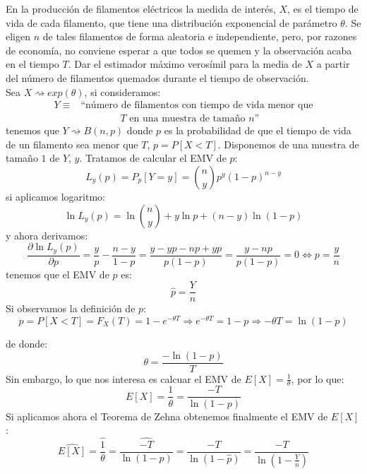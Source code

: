 \begin{ejercicio}
    En la producción de filamentos eléctricos la medida de interés, $X$, es el tiempo de vida de cada filamento, que tiene una distribución exponencial de parámetro $\theta$. Se eligen $n$ de tales filamentos de forma aleatoria e independiente, pero, por razones de economía, no conviene esperar a que todos se quemen y la observación acaba en el tiempo $T$. Dar el estimador máximo verosímil para la media de $X$ a partir del número de filamentos quemados durante el tiempo de observación.\\

    \noindent
    Sea $X\rightsquigarrow exp(\theta)$, si consideramos: 
    \begin{align*}
        Y\equiv &\text{``número de filamentos con tiempo de vida menor que} \\ &\qquad \qquad \text{$T$ en una muestra de tamaño $n$''} 
    \end{align*}
    tenemos que $Y\rightsquigarrow B(n,p)$ donde $p$ es la probabilidad de que el tiempo de vida de un filamento sea menor que $T$, $p = P[X<T]$. Disponemos de una muestra de tamaño $1$ de $Y$, $y$. Tratamos de calcular el EMV de $p$:
    \begin{equation*}
        L_y(p) = P_p[Y=y] = \binom{n}{y}p^y{(1-p)}^{n-y}
    \end{equation*}
    si aplicamos logaritmo:
    \begin{equation*}
        \ln L_y(p) = \ln\binom{n}{y} + y\ln p + (n-y)\ln (1-p)
    \end{equation*}
    y ahora derivamos:
    \begin{equation*}
        \dfrac{\partial \ln L_y(p)}{\partial p} = \frac{y}{p} - \frac{n-y}{1-p} = \frac{y - yp - np + yp}{p(1-p)} = \frac{y-np}{p(1-p)} = 0 \Longleftrightarrow p = \frac{y}{n}
    \end{equation*}
    tenemos que el EMV de $p$ es:
    \begin{equation*}
        \hat{p} = \frac{Y}{n}
    \end{equation*}
    Si observamos la definición de $p$:
    \begin{equation*}
        p = P[X<T] = F_X(T) = 1 - e^{-\theta T} \Longrightarrow e^{-\theta T} = 1-p \Longrightarrow -\theta T = \ln (1-p)
    \end{equation*}

    de donde:
    \begin{equation*}
        \theta = \frac{-\ln(1-p)}{T}
    \end{equation*}
    Sin embargo, lo que nos interesa es calcuar el EMV de $E[X] = \frac{1}{\theta}$, por lo que:
    \begin{equation*}
        E[X] = \frac{1}{\theta} = \frac{-T}{\ln(1-p)}
    \end{equation*}
    Si aplicamos ahora el Teorema de Zehna obtenemos finalmente el EMV de $E[X]$:
    \begin{equation*}
        \widehat{E[X]} = \widehat{\frac{1}{\theta}} = \widehat{\frac{-T}{\ln(1-p)}} = \frac{-T}{\ln(1-\hat{p})} = \frac{-T}{\ln\left(1-\frac{Y}{n}\right)}
    \end{equation*}
\end{ejercicio}

